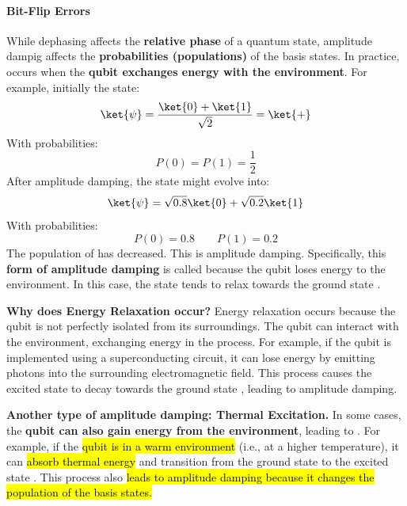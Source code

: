 \paragraph{Bit-Flip Errors}\label{sec:bit-flip-errors}

While dephasing affects the \textbf{relative phase} of a quantum state, amplitude dampig affects the \textbf{probabilities (populations)} of the basis states. In practice,  occurs when the \textbf{qubit exchanges energy with the environment}. For example, initially the state:
\begin{equation*}
    \ket{\psi} = \frac{\ket{0} + \ket{1}}{\sqrt{2}} = \ket{+}
\end{equation*}
With probabilities:
\begin{equation*}
    P(0) = P(1) = \frac{1}{2}
\end{equation*}
After amplitude damping, the state might evolve into:
\begin{equation*}
    \ket{\psi} = \sqrt{0.8}\ket{0} + \sqrt{0.2}\ket{1}
\end{equation*}
With probabilities:
\begin{equation*}
    P(0) = 0.8 \qquad P(1) = 0.2
\end{equation*}
The population of  has decreased. This is amplitude damping. Specifically, this \textbf{form of amplitude damping} is called  because the qubit loses energy to the environment. In this case, the state tends to relax towards the ground state .

\highspace
\textcolor{Green3}{ \textbf{Why does Energy Relaxation occur?}} Energy relaxation occurs because the qubit is not perfectly isolated from its surroundings. The qubit can interact with the environment, exchanging energy in the process. For example, if the qubit is implemented using a superconducting circuit, it can lose energy by emitting photons into the surrounding electromagnetic field. This process causes the excited state  to decay towards the ground state , leading to amplitude damping.

\highspace
\textcolor{Red2}{ \textbf{Another type of amplitude damping: Thermal Excitation.}} In some cases, the \textbf{qubit can also gain energy from the environment}, leading to . For example, if the \hl{qubit is in a warm environment} (i.e., at a higher temperature), it can \hl{absorb thermal energy} and transition from the ground state  to the excited state . This process also \hl{leads to amplitude damping because it changes the population of the basis states.}

